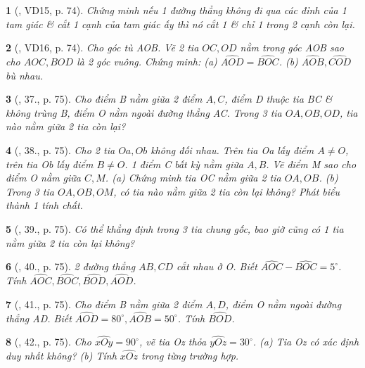 \documentclass{article}
\newtheorem{baitoan}{}
\begin{document}
\begin{baitoan}[\cite{Binh_Toan_6_tap_2}, VD15, p. 74]
	Chứng minh nếu 1 đường thẳng không đi qua các đỉnh của 1 tam giác \& cắt 1 cạnh của tam giác ấy thì nó cắt 1 \& chỉ 1 trong 2 cạnh còn lại.
\end{baitoan}

\begin{baitoan}[\cite{Binh_Toan_6_tap_2}, VD16, p. 74]
	Cho góc tù AOB. Vẽ 2 tia $OC,OD$ nằm trong góc AOB sao cho $AOC,BOD$ là 2 góc vuông. Chứng minh: (a) $\widehat{AOD} = \widehat{BOC}$. (b) $\widehat{AOB},\widehat{COD}$ bù nhau.
\end{baitoan}

\begin{baitoan}[\cite{Binh_Toan_6_tap_2}, 37., p. 75]
	Cho điểm B nằm giữa 2 điểm $A,C$, điểm D thuộc tia BC \& không trùng B, điểm O nằm ngoài đường thẳng AC. Trong 3 tia $OA,OB,OD$, tia nào nằm giữa 2 tia còn lại?
\end{baitoan}

\begin{baitoan}[\cite{Binh_Toan_6_tap_2}, 38., p. 75]
	Cho 2 tia $Oa,Ob$ không đối nhau. Trên tia Oa lấy điểm $A\ne O$, trên tia Ob lấy điểm $B\ne O$. 1 điểm C bất kỳ nằm giữa $A,B$. Vẽ điểm M sao cho điểm O nằm giữa $C,M$. (a) Chứng minh tia OC nằm giữa 2 tia $OA,OB$. (b) Trong 3 tia $OA,OB,OM$, có tia nào nằm giữa 2 tia còn lại không? Phát biểu thành 1 tính chất.
\end{baitoan}

\begin{baitoan}[\cite{Binh_Toan_6_tap_2}, 39., p. 75]
	Có thể khẳng định trong 3 tia chung gốc, bao giờ cũng có 1 tia nằm giữa 2 tia còn lại không?
\end{baitoan}

\begin{baitoan}[\cite{Binh_Toan_6_tap_2}, 40., p. 75]
	2 đường thẳng $AB,CD$ cắt nhau ở O. Biết $ \widehat{AOC} - \widehat{BOC} = 5^\circ$. Tính $\widehat{AOC},\widehat{BOC},\widehat{BOD},\widehat{AOD}$.
\end{baitoan}

\begin{baitoan}[\cite{Binh_Toan_6_tap_2}, 41., p. 75]
	Cho điểm B nằm giữa 2 điểm $A,D$, điểm O nằm ngoài đường thẳng AD. Biết $\widehat{AOD} = 80^\circ,\widehat{AOB} = 50^\circ$. Tính $\widehat{BOD}$.
\end{baitoan}

\begin{baitoan}[\cite{Binh_Toan_6_tap_2}, 42., p. 75]
	Cho $\widehat{xOy} = 90^\circ$, vẽ tia Oz thỏa $\widehat{yOz} = 30^\circ$. (a) Tia Oz có xác định duy nhất không? (b) Tính $\widehat{xOz}$ trong từng trường hợp.
\end{baitoan}
\end{document}
